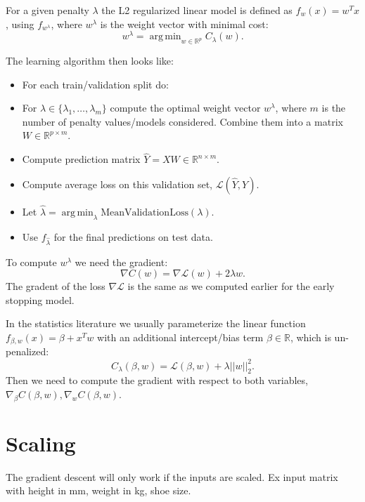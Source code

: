 \documentclass{article}
\DeclareMathOperator*{\argmin}{arg\,min}
\begin{document}
For a given penalty $\lambda$ the L2 regularized linear model is
defined as $f_w(x)= w^T x$, using $f_{w^\lambda}$, where $w^\lambda$ is the
weight vector with minimal cost:
\begin{equation}
  w^\lambda = \argmin_{w\in\mathbb R^p} C_\lambda(w).
\end{equation}

The learning algorithm then looks like:
\begin{itemize}
\item For each train/validation split do:
\item For $\lambda\in\{\lambda_1, \dots, \lambda_{m}\}$ compute the
  optimal weight vector $w^\lambda$, where $m$ is the number of
  penalty values/models considered. Combine them into a matrix
  $W\in\mathbb R^{p\times m}$.
\item Compute prediction matrix $\hat Y = XW\in\mathbb R^{n\times m}$.
\item Compute average loss on this validation set,
  $\mathcal L(\hat Y, Y)$.
\item Let $\hat \lambda = \argmin_\lambda \text{MeanValidationLoss}(\lambda)$.
\item Use $f_{\hat \lambda}$ for the final predictions on test data.
\end{itemize}

To compute $w^\lambda$ we need the gradient:
\begin{equation}
  \label{eq:L2-reg-gradient}
  \nabla C(w) = \nabla \mathcal L(w) + 2\lambda w.
\end{equation}
The gradent of the loss $\nabla \mathcal L$ is the same as we computed
earlier for the early stopping model.

In the statistics literature we usually parameterize the linear
function $f_{\beta,w}(x)=\beta + x^T w$ with an additional
intercept/bias term $\beta\in\mathbb R$, which is un-penalized:
\begin{equation}
  \label{eq:cost-bias}
  C_\lambda(\beta, w) = \mathcal L(\beta,w) + \lambda||w||_2^2.
\end{equation}
Then we need to compute the gradient with respect to both variables,
$\nabla_\beta C(\beta, w), \nabla_w C(\beta, w)$.

\section{Scaling}

The gradient descent will only work if the inputs are scaled. Ex input
matrix with height in mm, weight in kg, shoe size.
\end{document}
